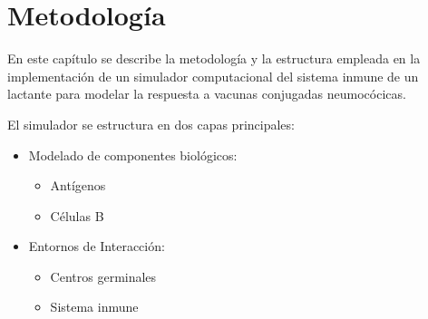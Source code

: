 \chapter{Metodología}\label{chapter:metodologia}

En este capítulo se describe la metodología y la estructura empleada en la implementación de un simulador computacional del sistema inmune de un lactante para modelar la respuesta a vacunas conjugadas neumocócicas.

El simulador se estructura en dos capas principales:
\begin{itemize}
    \item Modelado de componentes biológicos:
        \begin{itemize}
            \item Antígenos
            \item Células B
        \end{itemize}
    \item Entornos de Interacción:
        \begin{itemize}
            \item Centros germinales
            \item Sistema inmune
        \end{itemize}
\end{itemize}
